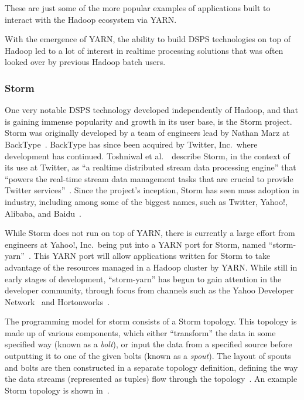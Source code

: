 These are just some of the more popular examples of applications built to interact with the Hadoop ecosystem via YARN.

With the emergence of YARN, the ability to build DSPS technologies on top of Hadoop led to a lot of interest in realtime
processing solutions that was often looked over by previous Hadoop batch users.



\subsubsection{Storm} %
\label{ssub:storm}

One very notable DSPS technology developed independently of Hadoop, and that is gaining immense popularity and growth in its
user base, is the Storm project. Storm was originally developed by a team of engineers lead by Nathan Marz at
BackType~\cite{web_storm}. BackType has since been acquired by Twitter, Inc.\ where development has
continued. Toshniwal et al.~\cite{toshniwal2014storm}\ describe Storm, in the context of its use at Twitter, as ``a
realtime distributed stream data processing engine'' that ``powers the real-time stream data management tasks that are
crucial to provide Twitter services''~\cite[p.\ 147]{toshniwal2014storm}. Since the project's inception, Storm has seen mass
adoption in industry, including among some of the biggest names, such as Twitter, Yahoo!, Alibaba, and
Baidu~\cite{storm_users}.

While Storm does not run on top of YARN, there is currently a large effort from engineers at Yahoo!, Inc.\ being put
into a YARN port for Storm, named ``storm-yarn''~\cite{web_storm_yarn,kumar2014architectural}. This YARN port will
allow applications written for Storm to take advantage of the resources managed in a Hadoop cluster by YARN. While still
in early stages of development, ``storm-yarn'' has begun to gain attention in the developer community, through focus from
channels such as the Yahoo Developer Network~\cite{web_yahoo_blog} and Hortonworks~\cite{web_hortonworks_blog}.

The programming model for storm consists of a Storm topology. This topology is made up of various components, which
either ``transform'' the data in some specified way (known as a \textit{bolt}), or input the data from a specified source
before outputting it to one of the given bolts (known as a \textit{spout}). The layout of spouts and bolts are then
constructed in a separate topology definition, defining the way the data streams (represented as tuples) flow through
the topology~\cite{jones2013process}. An example Storm topology is shown in~.

